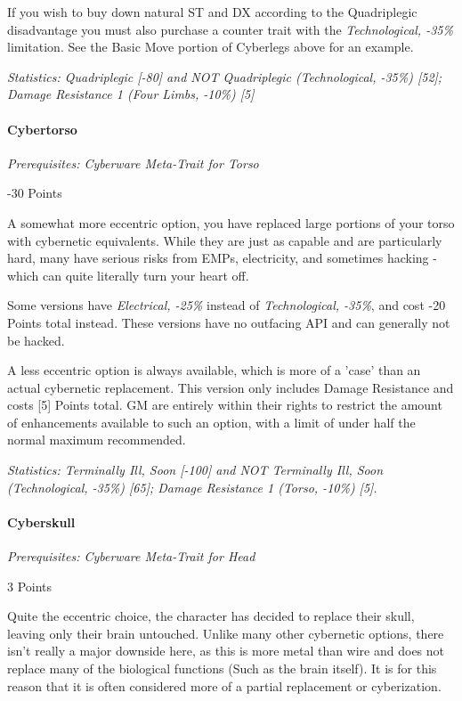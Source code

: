 \begin{multicols*}{3}
	If you wish to buy down natural ST and DX according to the Quadriplegic disadvantage you must also purchase a counter trait with the \textit{Technological, -35\%} limitation. See the Basic Move portion of Cyberlegs above for an example.
	
	\textit{\textcolor{OliveGreen}{Statistics: Quadriplegic [-80] and NOT Quadriplegic (Technological, -35\%) [52]; Damage Resistance 1 (Four Limbs, -10\%) [5]}}
	
	\paragraph{Cybertorso}
	\textit{Prerequisites:  Cyberware Meta-Trait for Torso}
	\begin{flushright}
		-30 Points
	\end{flushright}

	A somewhat more eccentric option, you have replaced large portions of your torso with cybernetic equivalents. While they are just as capable and are particularly hard, many have serious risks from EMPs, electricity, and sometimes hacking - which can quite literally turn your heart off.
	
	Some versions have \textit{Electrical, -25\%} instead of \textit{Technological, -35\%}, and cost -20 Points total instead. These versions have no outfacing API and can generally not be hacked.
	
	A less eccentric option is always available, which is more of a 'case' than an actual cybernetic replacement. This version only includes Damage Resistance and costs [5] Points total. GM are entirely within their rights to restrict the amount of enhancements available to such an option, with a limit of under half the normal maximum recommended.
	
	\textit{\textcolor{OliveGreen}{Statistics: Terminally Ill, Soon [-100] and NOT Terminally Ill, Soon (Technological, -35\%) [65]; Damage Resistance 1 (Torso, -10\%) [5].}}
	
	\paragraph{Cyberskull}
	\textit{Prerequisites:  Cyberware Meta-Trait for Head}
	\begin{flushright}
		3 Points
	\end{flushright}

	Quite the eccentric choice, the character has decided to replace their skull, leaving only their brain untouched. Unlike many other cybernetic options, there isn't really a major downside here, as this is more metal than wire and does not replace many of the biological functions (Such as the brain itself). It is for this reason that it is often considered more of a partial replacement or cyberization. 
	

\end{multicols*}
